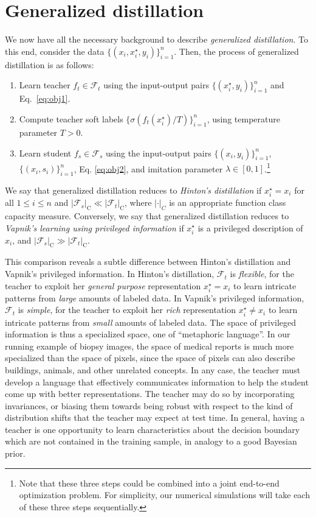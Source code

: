 \documentclass{article}
\begin{document}
\section{Generalized distillation}\label{sec:gendistillation}
We now have all the necessary background to describe \emph{generalized
distillation}. To this end, consider the data
$\{(x_i,x^\star_i,y_i)\}_{i=1}^n$. Then, the process of {generalized
distillation} is as follows:
\begin{enumerate}
  \item Learn teacher $f_t\in\mathcal{F}_t$ using the input-output pairs
  $\{(x^\star_i, y_i)\}_{i=1}^n$ and Eq.~\ref{eq:obj1}.
  \item Compute teacher soft labels $\{\sigma(f_t(x^\star_i)/T)\}_{i=1}^n$,
  using temperature parameter $T>0$.
  \item Learn student $f_s\in\mathcal{F}_s$ using the input-output pairs
  $\{(x_i, y_i)\}_{i=1}^n$, $\{(x_i, s_i)\}_{i=1}^n$, Eq. 
  \ref{eq:obj2}, and imitation parameter $\lambda \in [0,1]$.\footnote{Note
  that these three steps could be combined into a joint end-to-end optimization
  problem. For simplicity, our numerical simulations will take each of these
  three steps sequentially.} 
\end{enumerate}

We say that generalized distillation reduces to \emph{Hinton's distillation} if
$x^\star_i = x_i$ for all $1 \leq i \leq n$ and $|\mathcal{F}_s|_{\textrm{C}}
\ll |\mathcal{F}_t|_{\textrm{C}}$, where $|\cdot|_C$ is an appropriate function
class capacity measure. Conversely, we say that generalized distillation
reduces to \emph{Vapnik's learning using privileged information} if $x^\star_i$
is a privileged description of $x_i$, and $|\mathcal{F}_s|_{\textrm{C}} \gg
|\mathcal{F}_t|_{\textrm{C}}$.

This comparison reveals a subtle difference between Hinton's distillation and
Vapnik's privileged information.  In Hinton's distillation, $\mathcal{F}_t$ is
\emph{flexible}, for the teacher to exploit her \emph{general purpose}
representation $x^\star_i = x_i$ to learn intricate patterns from \emph{large}
amounts of labeled data. In Vapnik's privileged information, $\mathcal{F}_t$ is
\emph{simple}, for the teacher to exploit her \emph{rich} representation
$x^\star_i \neq x_i$ to learn intricate patterns from \emph{small} amounts of
labeled data.  The space of privileged information is thus a specialized space,
one of ``metaphoric language''. In our running example of biopsy images, the
space of medical reports is much more specialized than the space of pixels,
since the space of pixels can also describe buildings, animals, and other
unrelated concepts.  In any case, the teacher must develop a language that
effectively communicates information to help the student come up with better
representations. The teacher may do so by incorporating invariances, or biasing
them towards being robust with respect to the kind of distribution shifts that
the teacher may expect at test time.  In general, having a teacher is one
opportunity to learn characteristics about the decision boundary which are not
contained in the training sample, in analogy to a good Bayesian prior.
\end{document}
